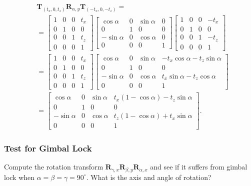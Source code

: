 \documentclass[10pt]{article}
\begin{document}
$$
\begin{aligned}
& \mathbf{T}_{\left(t_{x}, 0, t_{z}\right)} \mathbf{R}_{\alpha, y} \mathbf{T}_{\left(-t_{x}, 0,-t_{z}\right)}= \\
& =\left[\begin{array}{cccc}
1 & 0 & 0 & t_{x} \\
0 & 1 & 0 & 0 \\
0 & 0 & 1 & t_{z} \\
0 & 0 & 0 & 1
\end{array}\right]\left[\begin{array}{cccc}
\cos \alpha & 0 & \sin \alpha & 0 \\
0 & 1 & 0 & 0 \\
-\sin \alpha & 0 & \cos \alpha & 0 \\
0 & 0 & 0 & 1
\end{array}\right]\left[\begin{array}{cccc}
1 & 0 & 0 & -t_{x} \\
0 & 1 & 0 & 0 \\
0 & 0 & 1 & -t_{z} \\
0 & 0 & 0 & 1
\end{array}\right] \\
& =\left[\begin{array}{cccc}
1 & 0 & 0 & t_{x} \\
0 & 1 & 0 & 0 \\
0 & 0 & 1 & t_{z} \\
0 & 0 & 0 & 1
\end{array}\right]\left[\begin{array}{cccc}
\cos \alpha & 0 & \sin \alpha & -t_{x} \cos \alpha-t_{z} \sin \alpha \\
0 & 1 & 0 & 0 \\
-\sin \alpha & 0 & \cos \alpha & t_{x} \sin \alpha-t_{z} \cos \alpha \\
0 & 0 & 0 & 1
\end{array}\right] \\
& =\left[\begin{array}{cccc}
\cos \alpha & 0 & \sin \alpha & t_{x}(1-\cos \alpha)-t_{z} \sin \alpha \\
0 & 1 & 0 & 0 \\
-\sin \alpha & 0 & \cos \alpha & t_{z}(1-\cos \alpha)+t_{x} \sin \alpha \\
0 & 0 & 0 & 1
\end{array}\right] \text {. }
\end{aligned}
$$

\subsubsection{Test for Gimbal Lock}
Compute the rotation transform $\mathbf{R}_{\gamma, x} \mathbf{R}_{\beta, y} \mathbf{R}_{\alpha, x}$ and see if it suffers from gimbal lock when $\alpha=\beta=\gamma=90^{\circ}$. What is the axis and angle of rotation?
\end{document}
